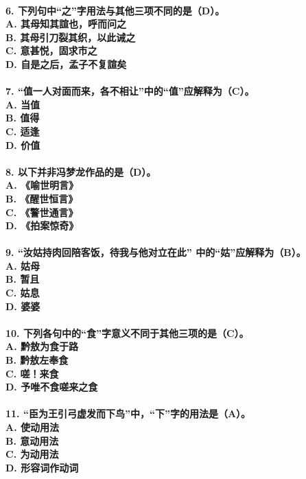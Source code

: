 \documentclass[UTF8]{ctexart} %
\begin{document}
\paragraph{
6. 下列句中“之”字用法与其他三项不同的是（\color{red}D\color{black}）。 \\
    A. 其母知其諠也，呼而问之 \\
    B. 其母引刀裂其织，以此诫之 \\
    C. 意甚悦，固求市之 \\
    D. 自是之后，孟子不复諠矣
}
\paragraph{
7. “值一人对面而来，各不相让”中的“值”应解释为（\color{red}C\color{black}）。 \\
    A. 当值 \\
    B. 值得 \\
    C. 适逢 \\
    D. 价值
}
\paragraph{
8. 以下并非冯梦龙作品的是（\color{red}D\color{black}）。 \\
    A. 《喻世明言》 \\
    B. 《醒世恒言》 \\
    C. 《警世通言》 \\
    D. 《拍案惊奇》
}
\paragraph{
9. “汝姑持肉回陪客饭，待我与他对立在此” 中的“姑”应解释为（\color{red}B\color{black}）。 \\
    A. 姑母 \\
    B. 暂且 \\
    C. 姑息 \\
    D. 婆婆
}
\paragraph{
10. 下列各句中的“食”字意义不同于其他三项的是（\color{red}C\color{black}）。 \\
    A. 黔敖为食于路 \\
    B. 黔敖左奉食 \\
    C. 嗟！来食 \\
    D. 予唯不食嗟来之食
}
\paragraph{
11. “臣为王引弓虚发而下鸟”中，“下”字的用法是（\color{red}A\color{black}）。 \\
    A. 使动用法 \\
    B. 意动用法 \\
    C. 为动用法 \\
    D. 形容词作动词
}
\end{document}
